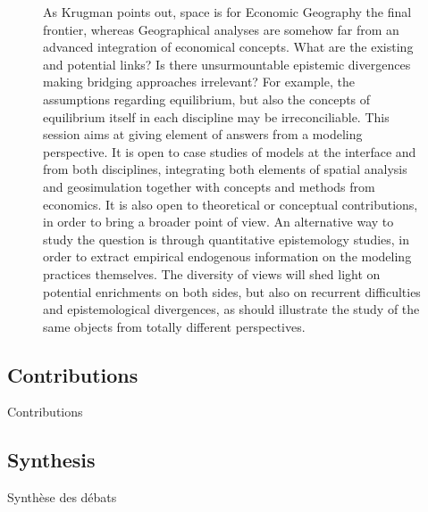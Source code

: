 \begin{figure}[h!]
\begin{mdframed}
	
	As Krugman points out, space is for Economic Geography the final frontier, whereas Geographical analyses are somehow far from an advanced integration of economical concepts. What are the existing and potential links? Is there unsurmountable epistemic divergences making bridging approaches irrelevant? For example, the assumptions regarding equilibrium, but also the concepts of equilibrium itself in each discipline may be irreconciliable. This session aims at giving element of answers from a modeling perspective. It is open to case studies of models at the interface and from both disciplines, integrating both elements of spatial analysis and geosimulation together with concepts and methods from economics. It is also open to theoretical or conceptual contributions, in order to bring a broader point of view. An alternative way to study the question is through quantitative epistemology studies, in order to extract empirical endogenous information on the modeling practices themselves. The diversity of views will shed light on potential enrichments on both sides, but also on recurrent difficulties and epistemological divergences, as should illustrate the study of the same objects from totally different perspectives.
	
\end{mdframed}
\end{figure}



\subsection*{Contributions}{Contributions}





\subsection*{Synthesis}{Synthèse des débats}









\stars

\newpage





